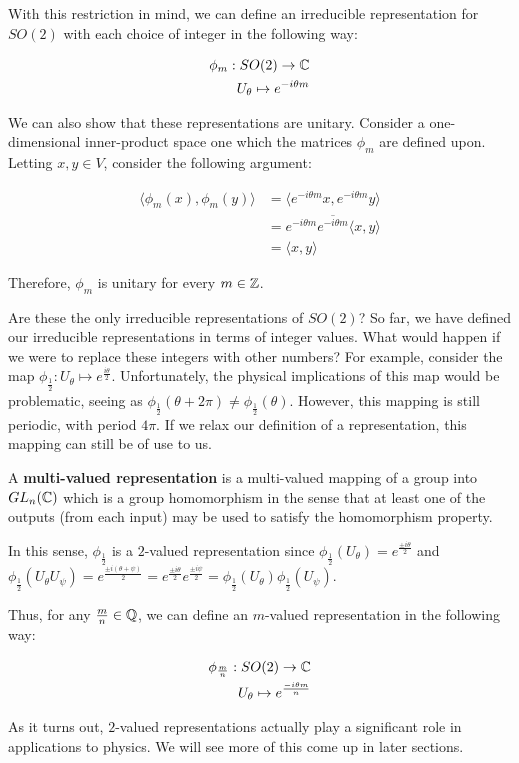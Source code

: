 With this restriction in mind, we can define an irreducible representation for $SO(2)$ with each choice of integer in the following way:

$$\begin{aligned}
	\phi_m:SO(2)\rightarrow \mathbb{C} \\
	U_\theta \mapsto e^{-i\theta m} \\
\end{aligned}$$

We can also show that these representations are unitary. Consider a one-dimensional inner-product space one which the matrices $\phi_m$ are defined upon. Letting $x,y\in V$, consider the following argument:

\begin{equation}
	\begin{aligned}
		\langle \phi_m(x) , \phi_m(y) \rangle &= \langle e^{-i\theta m}x , e^{-i\theta m}y \rangle \\
												&= e^{-i\theta m}\overline{e^{-i\theta m}} \langle x , y \rangle\\
												&=\langle x , y \rangle
	\end{aligned}
\end{equation}

Therefore, $\phi_m$ is unitary for every $m\in\mathbb{Z}$. 

Are these the only irreducible representations of $SO(2)$? So far, we have defined our irreducible representations in terms of integer values. What would happen if we were to replace these integers with other numbers? For example, consider the map $\phi_{\frac{1}{2}}: U_\theta \mapsto e^\frac{i\theta}{2}$. Unfortunately, the physical implications of this map would be problematic, seeing as $\phi_\frac{1}{2}(\theta + 2\pi) \neq  \phi_\frac{1}{2}(\theta)$. However, this mapping is still periodic, with period $4\pi$. If we relax our definition of a representation, this mapping can still be of use to us.

\begin{definition}
	A \textbf{multi-valued representation} is a multi-valued mapping of a group into $GL_n(\mathbb{C})$ which is a group homomorphism in the sense that at least one of the outputs (from each input) may be used to satisfy the homomorphism property.
\end{definition}

In this sense, $\phi_{\frac{1}{2}}$ is a $2$-valued representation since $\phi_{\frac{1}{2}}(U_\theta) = e^\frac{\pm i\theta}{2}$ and $\phi_{\frac{1}{2}}(U_\theta U_\psi) =  e^\frac{\pm i(\theta + \psi)}{2} =  e^\frac{\pm i\theta}{2} e^\frac{\pm i\psi}{2} = \phi_{\frac{1}{2}}(U_\theta)\phi_{\frac{1}{2}}(U_\psi)$.

Thus, for any $\frac{m}{n} \in \mathbb{Q}$, we can define an $m$-valued representation in the following way:

$$\begin{aligned}
	\phi_\frac{m}{n}:SO(2)\rightarrow \mathbb{C} \\
	U_\theta \mapsto e^\frac{-i\theta m}{n} \\
\end{aligned}$$

As it turns out, $2$-valued representations actually play a significant role in applications to physics. We will see more of this come up in later sections.